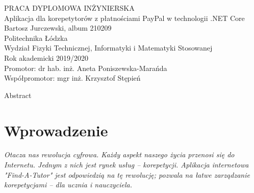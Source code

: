 \documentclass[12pt]{article}
\numberwithin{figure}{section}
\begin{document}
\begin{sloppypar}
\begin{titlepage}
 \thispagestyle{empty}
 \begin{center}
  \vspace{3cm}
  \large
    PRACA DYPLOMOWA INŻYNIERSKA\\
  \vspace{4cm}
  \Huge
    Aplikacja dla korepetytorów z płatnościami PayPal w technologii .NET Core\\
  \large
  \vspace{2cm}
  Bartosz Jurczewski, album 210209\\
  \bigbreak
  Politechnika Łódzka\\
  Wydział Fizyki Technicznej, Informatyki i Matematyki Stosowanej\\
  Rok akademicki 2019/2020\\
  \bigbreak
   Promotor: dr hab. inż. Aneta Poniszewska-Marańda \\
   Współpromotor: mgr inż. Krzysztof Stępień\\
 \end{center}
\end{titlepage}

\clearpage
{}
\setcounter{page}{2}
\setcounter{secnumdepth}{3}

\tableofcontents
\pagebreak

Abstract


\pagebreak
\section{Wprowadzenie}
\textit{Otacza nas rewolucja cyfrowa. Każdy aspekt naszego życia przenosi się do Internetu. Jednym z nich jest rynek usług -- korepetycji. Aplikacja internetowa "Find-A-Tutor" jest odpowiedzią na tę rewolucję; pozwala na łatwe zarządzanie korepetycjami -- dla ucznia i nauczyciela.}

\end{sloppypar}
\end{document}
